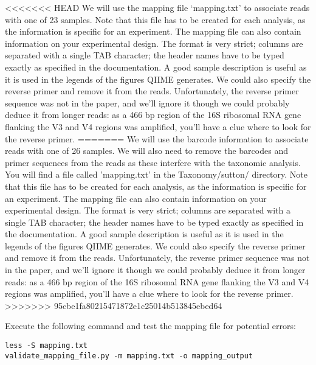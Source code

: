 \begin{information}
<<<<<<< HEAD
We will use the mapping file ‘mapping.txt’ to associate reads with one of 23 samples.
Note that this file has to be created for each analysis, as the information is specific for an experiment. The mapping file can also contain information on your experimental design. The format is very strict; columns are separated with a single TAB character; the header names have to be typed exactly as specified in the documentation. A good sample description is useful as it is used in the legends of the figures QIIME generates. We could also specify the reverse primer and remove it from the reads. Unfortunately, the reverse primer sequence was not in the paper, and we’ll ignore it though we could probably deduce it from longer reads: as a 466 bp region of the 16S ribosomal RNA gene flanking the V3 and V4 regions was amplified, you’ll have a clue where to look for the reverse primer.
=======
We will use the barcode information to associate reads with one of 26 samples. We will also need to remove the barcodes and primer sequences from the reads as these interfere with the taxonomic analysis. 
You will find a file called 'mapping.txt' in the Taxonomy/sutton/ directory. 
Note that this file has to be created for each analysis, as the information is specific for an experiment. The mapping file can also contain information on your experimental design. The format is very strict; columns are separated with a single TAB character; the header names have to be typed exactly as specified in the documentation. A good sample description is useful as it is used in the legends of the figures QIIME generates. We could also specify the reverse primer and remove it from the reads. Unfortunately, the reverse primer sequence was not in the paper, and we'll ignore it though we could probably deduce it from longer reads: as a 466 bp region of the 16S ribosomal RNA gene flanking the V3 and V4 regions was amplified, you'll have a clue where to look for the reverse primer.
>>>>>>> 95cbe1fa80215471872e1c25014b513845ebed64

\end{information}

\begin{steps}
Execute the following command and test the mapping file for potential errors:
\begin{lstlisting}
less -S mapping.txt
validate_mapping_file.py -m mapping.txt -o mapping_output
\end{lstlisting}
\end{steps}

